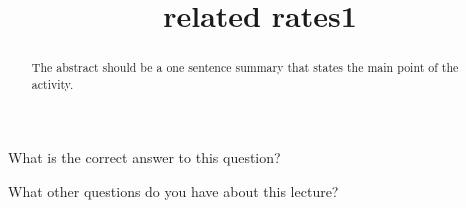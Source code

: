 \documentclass{ximera}
\title{related rates1}
\begin{document}
\begin{abstract}
  The abstract should be a one sentence summary that states the main point of the activity.
\end{abstract}

\maketitle

\begin{question}
  What is the correct answer to this question?

  \begin{solution}
    \begin{multiple-choice}
    \end{multiple-choice}  
  \end{solution}
\end{question}

What other questions do you have about this lecture?
\begin{free-response}
\end{free-response}
\end{document}
